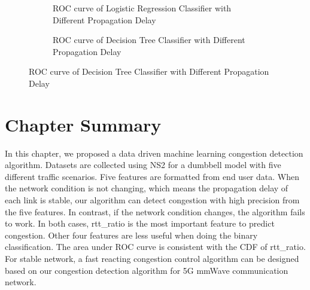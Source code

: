 \begin{figure}[!htb]\centering
\begin{subfigure}{0.49\textwidth}
\caption{ROC curve of Logistic Regression Classifier with Different Propagation Delay}
\label{LRROCDiff}
\end{subfigure}
\begin{subfigure}{0.49\textwidth}
\caption{ROC curve of Decision Tree Classifier with Different Propagation Delay}
\label{DTROCDiff}
\end{subfigure}
\end{figure}




\section{Chapter Summary}
\label{Conclusions and Future Work}
In this chapter, we proposed a data driven machine learning congestion detection algorithm. Datasets are collected using NS2 for a dumbbell model with five different traffic scenarios. Five features are formatted from end user data. When the network condition is not changing, which means the propagation delay of each link is stable, our algorithm can detect congestion with high precision from the five features. In contrast, if the network condition changes, the algorithm fails to work. In both cases, rtt\_ratio is the most important feature to predict congestion. Other four features are less useful when doing the binary classification. The area under ROC curve is consistent with the CDF of rtt\_ratio. For stable network, a fast reacting congestion control algorithm can be designed based on our congestion detection algorithm for 5G mmWave communication network.
